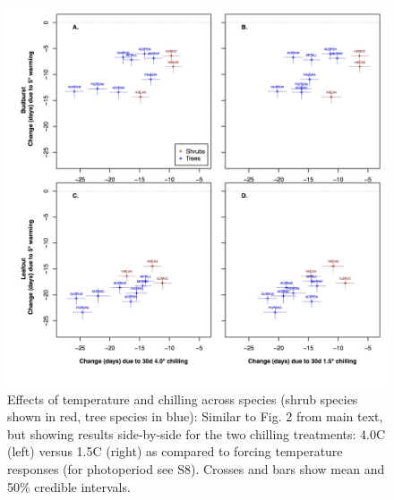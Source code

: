 \documentclass{article}
\begin{document}
\begin{figure}
\label{fig:figS6}
\includegraphics[width=1\textwidth]{FigChill2_4panel.png}
\caption{Effects of temperature and chilling across species (shrub species shown in red, tree species in blue): Similar to Fig. 2 from main text, but showing results side-by-side for the two chilling treatments: 4.0\degree C (left) versus 1.5\degree C (right) as compared to forcing temperature responses (for photoperiod see S8). Crosses and bars show mean and 50\% credible intervals.}
\end{figure}
\end{document}
